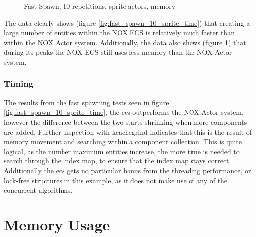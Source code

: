 \begin{figure}[htb]
\centering
{}
\caption{Fast Spawn, 10 repetitions, sprite actors, memory}
\label{fig:fast_spawn_10_sprite_peak_memory}
\end{figure}

The data clearly shows (figure \ref{fig:fast_spawn_10_sprite_time}) that creating a large number of entities within the NOX ECS is relatively much faster than within the NOX Actor system.
Additionally, the data also shows (figure \ref{fig:fast_spawn_10_sprite_peak_memory}) that during its peaks the NOX ECS still uses less memory than the NOX Actor system.

\subsubsection{Timing}
The results from the fast spawning tests seen in figure \ref{fig:fast_spawn_10_sprite_time},
the ecs outperforms the NOX Actor system, however the difference between the two
starts shrinking when more components are added.
Further inspection with kcachegrind indicates that this is the result of memory movement and searching within a component collection.
This is quite logical, as the number maximum entities increase, the more time is needed
to search through the index map, to ensure that the index map stays correct.
Additionally the ecs gets no particular bonus from the threading performance, or lock-free structures
in this example, as it does not make use of any of the concurrent algorithms.

\section{Memory Usage}
